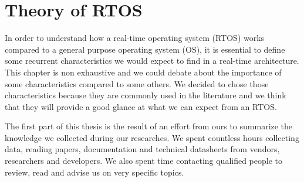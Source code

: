 \chapter{Theory of RTOS\label{part:rtos-theory}}

In order to understand how a real-time operating system (RTOS) works compared to a general purpose operating system (OS),
    it is essential to define some recurrent characteristics we would expect to find in a real-time architecture.
\\
This chapter is non exhaustive and we could debate about the importance of some characteristics compared to some others.
We decided to chose those characteristics because they are commonly used in the literature
    and we think that they will provide a good glance at what we can expect from an RTOS.

The first part of this thesis is the result of an effort from ours to summarize the knowledge we collected during our researches.
We spent countless hours collecting data, reading papers, documentation and technical datasheets from vendors, researchers and developers.
We also spent time contacting qualified people to review, read and advise us on very specific topics.











